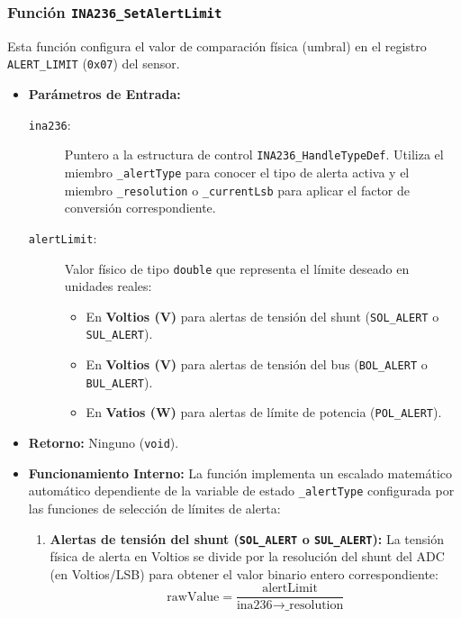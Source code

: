 \documentclass[
10pt, %
a4paper, %
oneside, %
headinclude,footinclude, %
BCOR5mm, %
]{scrartcl}
\begin{document}
\subsubsection{Función \texttt{INA236\_SetAlertLimit}}
Esta función configura el valor de comparación física (umbral) en el registro \texttt{ALERT\_LIMIT} (\texttt{0x07}) del sensor.

\begin{itemize}
	\item \textbf{Parámetros de Entrada:}
		\begin{description}
			\item[\texttt{ina236}:] Puntero a la estructura de control \texttt{INA236\_HandleTypeDef}. Utiliza el miembro \texttt{\_alertType} para conocer el tipo de alerta activa y el miembro \texttt{\_resolution} o \texttt{\_currentLsb} para aplicar el factor de conversión correspondiente.
			\item[\texttt{alertLimit}:] Valor físico de tipo \texttt{double} que representa el límite deseado en unidades reales:
				\begin{itemize}
					\item En \textbf{Voltios (V)} para alertas de tensión del shunt (\texttt{SOL\_ALERT} o \texttt{SUL\_ALERT}).
					\item En \textbf{Voltios (V)} para alertas de tensión del bus (\texttt{BOL\_ALERT} o \texttt{BUL\_ALERT}).
					\item En \textbf{Vatios (W)} para alertas de límite de potencia (\texttt{POL\_ALERT}).
				\end{itemize}
		\end{description}
	\item \textbf{Retorno:} Ninguno (\texttt{void}).
	\item \textbf{Funcionamiento Interno:}
		La función implementa un escalado matemático automático dependiente de la variable de estado \texttt{\_alertType} configurada por las funciones de selección de límites de alerta:
		\begin{enumerate}
			\item \textbf{Alertas de tensión del shunt (\texttt{SOL\_ALERT} o \texttt{SUL\_ALERT}):} La tensión física de alerta en Voltios se divide por la resolución del shunt del ADC (en Voltios/LSB) para obtener el valor binario entero correspondiente:
				\begin{equation}
					\text{rawValue} = \frac{\text{alertLimit}}{\text{ina236}\rightarrow\text{\_resolution}}
				\end{equation}

\end{enumerate}
\end{itemize}
\end{document}
